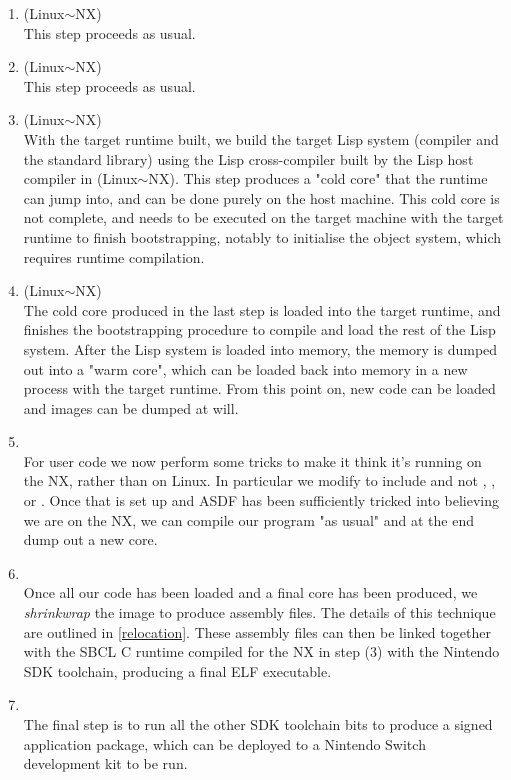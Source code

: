 \documentclass[format=sigconf]{acmart}
\begin{document}
\begin{enumerate}
\item {} (Linux$\sim$NX) \\
  This step proceeds as usual.
\item {} (Linux$\sim$NX) \\
  This step proceeds as usual.
\item {} (Linux$\sim$NX) \\
  With the target runtime built, we build the target Lisp system (compiler and the standard library) using the Lisp cross-compiler built by the Lisp host compiler in  (Linux$\sim$NX). This step produces a "cold core" that the runtime can jump into, and can be done purely on the host machine. This cold core is not complete, and needs to be executed on the target machine with the target runtime to finish bootstrapping, notably to initialise the object system, which requires runtime compilation.
\item {} (Linux$\sim$NX) \\
  The cold core produced in the last step is loaded into the target runtime, and finishes the bootstrapping procedure to compile and load the rest of the Lisp system. After the Lisp system is loaded into memory, the memory is dumped out into a "warm core", which can be loaded back into memory in a new process with the target runtime. From this point on, new code can be loaded and images can be dumped at will.
\item {} \\
  For user code we now perform some tricks to make it think it's running on the NX, rather than on Linux. In particular we modify  to include  and not , , or . Once that is set up and ASDF has been sufficiently tricked into believing we are on the NX, we can compile our program "as usual" and at the end dump out a new core.
\item {} \\
  Once all our code has been loaded and a final core has been produced, we \textit{shrinkwrap} the image to produce assembly files. The details of this technique are outlined in \autoref{relocation}. These assembly files can then be linked together with the SBCL C runtime compiled for the NX in step (3) with the Nintendo SDK toolchain, producing a final ELF executable.
\item {} \\
  The final step is to run all the other SDK toolchain bits to produce a signed application package, which can be deployed to a Nintendo Switch development kit to be run.
\end{enumerate}
\end{document}
